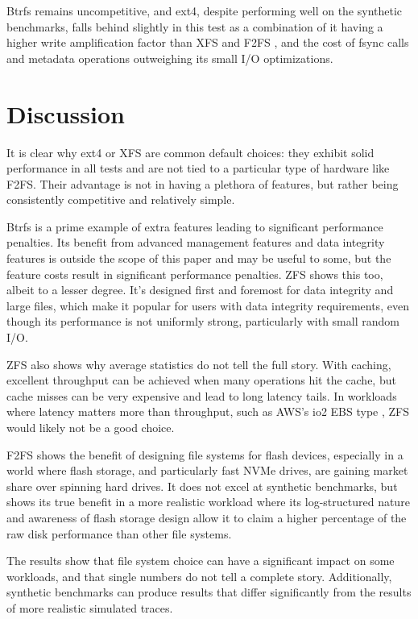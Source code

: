 \documentclass[letterpaper,twocolumn,10pt]{article}
\begin{document}
Btrfs remains uncompetitive, and ext4, despite performing well on the synthetic benchmarks, falls behind slightly in this test as a combination of it having a higher write amplification factor than XFS and F2FS \cite{io_amp}, and the cost of fsync calls and metadata operations outweighing its small I/O optimizations.

\section{Discussion}

It is clear why ext4 or XFS are common default choices: they exhibit solid performance in all tests and are not tied to a particular type of hardware like F2FS. Their advantage is not in having a plethora of features, but rather being consistently competitive and relatively simple.

Btrfs is a prime example of extra features leading to significant performance penalties. Its benefit from advanced management features and data integrity features is outside the scope of this paper and may be useful to some, but the feature costs result in significant performance penalties. ZFS shows this too, albeit to a lesser degree. It's designed first and foremost for data integrity and large files, which make it popular for users with data integrity requirements, even though its performance is not uniformly strong, particularly with small random I/O.

ZFS also shows why average statistics do not tell the full story. With caching, excellent throughput can be achieved when many operations hit the cache, but cache misses can be very expensive and lead to long latency tails. In workloads where latency matters more than throughput, such as AWS's io2 EBS type \cite{ebs}, ZFS would likely not be a good choice.

F2FS shows the benefit of designing file systems for flash devices, especially in a world where flash storage, and particularly fast NVMe drives, are gaining market share over spinning hard drives. It does not excel at synthetic benchmarks, but shows its true benefit in a more realistic workload where its log-structured nature and awareness of flash storage design allow it to claim a higher percentage of the raw disk performance than other file systems.

The results show that file system choice can have a significant impact on some workloads, and that single numbers do not tell a complete story. Additionally, synthetic benchmarks can produce results that differ significantly from the results of more realistic simulated traces.
\end{document}
